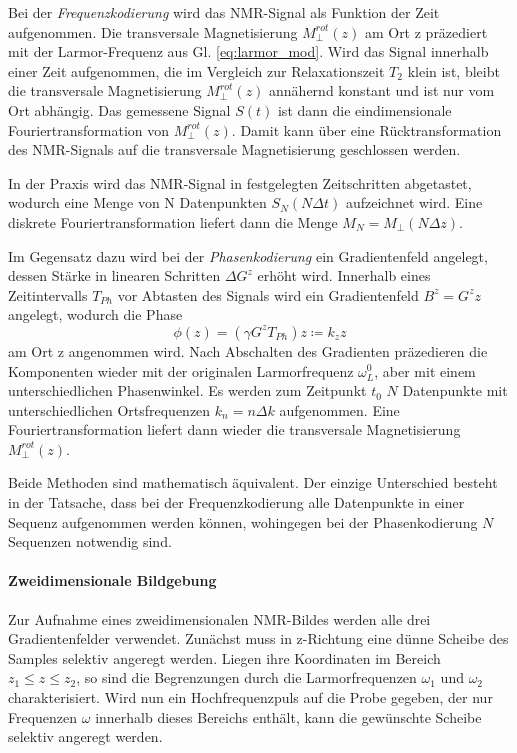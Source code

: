 \documentclass[a4paper]{scrartcl} %
\begin{document}
Bei der \emph{Frequenzkodierung} wird das NMR-Signal als Funktion der Zeit aufgenommen. Die transversale Magnetisierung $M_{\perp}^{rot}(z)$ am Ort z präzediert mit der Larmor-Frequenz aus Gl. \eqref{eq:larmor_mod}. Wird das Signal innerhalb einer Zeit aufgenommen, die im Vergleich zur Relaxationszeit $T_2$ klein ist, bleibt die transversale Magnetisierung $M_{\perp}^{rot}(z)$ annähernd konstant und ist nur vom Ort abhängig. Das gemessene Signal $S(t)$ ist dann die eindimensionale Fouriertransformation von $M_{\perp}^{rot}(z)$. Damit kann über eine Rücktransformation des NMR-Signals auf die transversale Magnetisierung geschlossen werden.

In der Praxis wird das NMR-Signal in festgelegten Zeitschritten abgetastet, wodurch eine Menge von N Datenpunkten ${S_N(N \Delta t)}$ aufzeichnet wird. Eine diskrete Fouriertransformation liefert dann die Menge $M_N=M_{\perp}(N \Delta z)$.

Im Gegensatz dazu wird bei der \emph{Phasenkodierung} ein Gradientenfeld angelegt, dessen Stärke in linearen Schritten $\Delta G^z$ erhöht wird. Innerhalb eines Zeitintervalls $T_{Ph}$ vor Abtasten des Signals wird ein Gradientenfeld $B^z = G^z z$ angelegt, wodurch die Phase
\begin{equation}
	\phi (z) = (\gamma G^z T_{Ph})z \coloneqq k_z z
\end{equation}
am Ort z angenommen wird. Nach Abschalten des Gradienten präzedieren die Komponenten wieder mit der originalen Larmorfrequenz $\omega_{L}^0$, aber mit einem unterschiedlichen Phasenwinkel. Es werden zum Zeitpunkt $t_0$ $N$ Datenpunkte mit unterschiedlichen Ortsfrequenzen $k_n=n\Delta k$ aufgenommen. Eine Fouriertransformation liefert dann wieder die transversale Magnetisierung $M_{\perp}^{rot}(z)$.

Beide Methoden sind mathematisch äquivalent. Der einzige Unterschied besteht in der Tatsache, dass bei der Frequenzkodierung alle Datenpunkte in einer Sequenz aufgenommen werden können, wohingegen bei der Phasenkodierung $N$ Sequenzen notwendig sind.

\paragraph{Zweidimensionale Bildgebung}

Zur Aufnahme eines zweidimensionalen NMR-Bildes werden alle drei Gradientenfelder verwendet. Zunächst muss in z-Richtung eine dünne Scheibe des Samples selektiv angeregt werden. Liegen ihre Koordinaten im Bereich $z_1 \leq z \leq z_2$, so sind die Begrenzungen durch die Larmorfrequenzen $\omega_1$ und $\omega_2$ charakterisiert. Wird nun ein Hochfrequenzpuls auf die Probe gegeben, der nur Frequenzen $\omega$ innerhalb dieses Bereichs enthält, kann die gewünschte Scheibe selektiv angeregt werden. 
\end{document}
